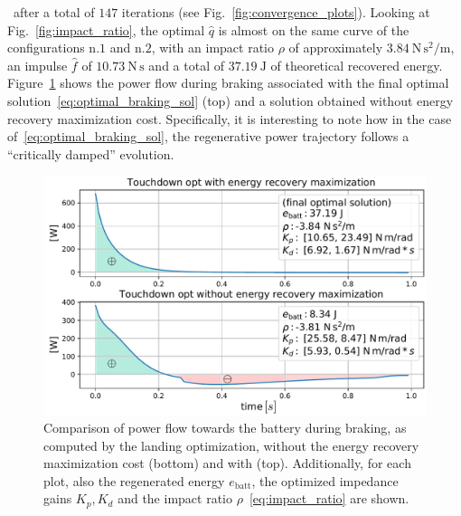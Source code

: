 ~\hspace{-0.55cm}after a total of $147$ iterations (see Fig.~\ref{fig:convergence_plots}). Looking at Fig.~\ref{fig:impact_ratio}, the optimal $\hat{q}$ is almost on the same curve of the configurations n.$1$ and n.$2$, with an impact ratio $\rho$ of approximately $3.84~\mathrm{N\,s^{2}/m}$, an impulse $\hat{f}$ of $10.73~\mathrm{N\,s}$ and a total of $37.19~\mathrm{J}$ of theoretical recovered energy. Figure~\ref{fig:critically_damped_pow} shows the power flow during braking associated with the final optimal solution~\eqref{eq:optimal_braking_sol} (top) and a solution obtained without energy recovery maximization cost. Specifically, it is interesting to note how in the case of~\eqref{eq:optimal_braking_sol}, the regenerative power trajectory follows a \enquote{critically damped} evolution. 
\begin{figure}[h]
	\centering
	\includegraphics[width=1\columnwidth]{images/critically_damped_vs_no_reg_pow_max.pdf}
	\caption{Comparison of power flow towards the battery during braking, as computed by the landing optimization, without the energy recovery maximization cost (bottom) and with (top). Additionally, for each plot, also the regenerated energy $e_{\mathrm{batt}}$, the optimized impedance gains $K_p, K_d$ and the impact ratio $\rho$~\eqref{eq:impact_ratio} are shown. \vspace{-0.3cm}}
	\label{fig:critically_damped_pow}
\end{figure}

